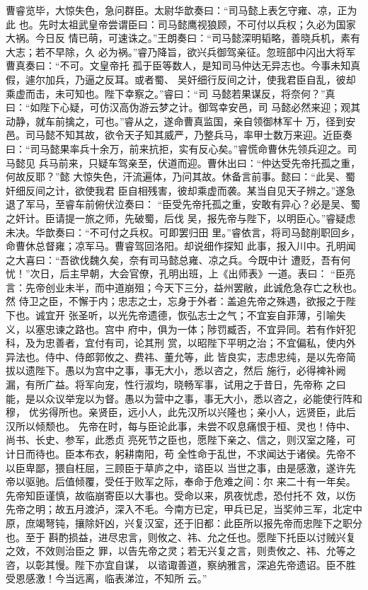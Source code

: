 曹睿览毕，大惊失色，急问群臣。太尉华歆奏曰：“司马懿上表乞守雍、凉，正为此
也。先时太祖武皇帝尝谓臣曰：司马懿鹰视狼顾，不可付以兵权；久必为国家大祸。今日反
情已萌，可速诛之。”王朗奏曰：“司马懿深明韬略，善晓兵机，素有大志；若不早除，久
必为祸。”睿乃降旨，欲兴兵御驾亲征。忽班部中闪出大将军曹真奏曰：“不可。文皇帝托
孤于臣等数人，是知司马仲达无异志也。今事未知真假，遽尔加兵，乃逼之反耳。或者蜀、
吴奸细行反间之计，使我君臣自乱，彼却乘虚而击，未可知也。陛下幸察之。”睿曰：“司
马懿若果谋反，将奈何？”真曰：“如陛下心疑，可仿汉高伪游云梦之计。御驾幸安邑，司
马懿必然来迎；观其动静，就车前擒之，可也。”睿从之，遂命曹真监国，亲自领御林军十
万，径到安邑。司马懿不知其故，欲令天子知其威严，乃整兵马，率甲士数万来迎。近臣奏
曰：“司马懿果率兵十余万，前来抗拒，实有反心矣。”睿慌命曹休先领兵迎之。司马懿见
兵马前来，只疑车驾亲至，伏道而迎。曹休出曰：“仲达受先帝托孤之重，何故反耶？”懿
大惊失色，汗流遍体，乃问其故。休备言前事。懿曰：“此吴、蜀奸细反间之计，欲使我君
臣自相残害，彼却乘虚而袭。某当自见天子辨之。”遂急退了军马，至睿车前俯伏泣奏曰：
“臣受先帝托孤之重，安敢有异心？必是吴、蜀之奸计。臣请提一旅之师，先破蜀，后伐
吴，报先帝与陛下，以明臣心。”睿疑虑未决。华歆奏曰：“不可付之兵权。可即罢归田
里。”睿依言，将司马懿削职回乡，命曹休总督雍；凉军马。曹睿驾回洛阳。却说细作探知
此事，报入川中。孔明闻之大喜曰：“吾欲伐魏久矣，奈有司马懿总雍、凉之兵。今既中计
遭贬，吾有何忧！”次日，后主早朝，大会官僚，孔明出班，上《出师表》一道。表曰：
“臣亮言：先帝创业未半，而中道崩殂；今天下三分，益州罢敝，此诚危急存亡之秋也。然
侍卫之臣，不懈于内；忠志之士，忘身于外者：盖追先帝之殊遇，欲报之于陛下也。诚宜开
张圣听，以光先帝遗德，恢弘志士之气；不宜妄自菲薄，引喻失义，以塞忠谏之路也。宫中
府中，俱为一体；陟罚臧否，不宜异同。若有作奸犯科，及为忠善者，宜付有司，论其刑
赏，以昭陛下平明之治；不宜偏私，使内外异法也。侍中、侍郎郭攸之、费祎、董允等，此
皆良实，志虑忠纯，是以先帝简拔以遗陛下。愚以为宫中之事，事无大小，悉以咨之，然后
施行，必得裨补阙漏，有所广益。将军向宠，性行淑均，晓畅军事，试用之于昔日，先帝称
之曰能，是以众议举宠以为督。愚以为营中之事，事无大小，悉以咨之，必能使行阵和穆，
优劣得所也。亲贤臣，远小人，此先汉所以兴隆也；亲小人，远贤臣，此后汉所以倾颓也。
先帝在时，每与臣论此事，未尝不叹息痛恨于桓、灵也！侍中、尚书、长史、参军，此悉贞
亮死节之臣也，愿陛下亲之、信之，则汉室之隆，可计日而待也。臣本布衣，躬耕南阳，苟
全性命于乱世，不求闻达于诸侯。先帝不以臣卑鄙，猥自枉屈，三顾臣于草庐之中，谘臣以
当世之事，由是感激，遂许先帝以驱驰。后值倾覆，受任于败军之际，奉命于危难之间：尔
来二十有一年矣。先帝知臣谨慎，故临崩寄臣以大事也。受命以来，夙夜忧虑，恐付托不
效，以伤先帝之明；故五月渡泸，深入不毛。今南方已定，甲兵已足，当奖帅三军，北定中
原，庶竭弩钝，攘除奸凶，兴复汉室，还于旧都：此臣所以报先帝而忠陛下之职分也。至于
斟酌损益，进尽忠言，则攸之、祎、允之任也。愿陛下托臣以讨贼兴复之效，不效则治臣之
罪，以告先帝之灵；若无兴复之言，则责攸之、祎、允等之咨，以彰其慢。陛下亦宜自谋，
以谘诹善道，察纳雅言，深追先帝遗诏。臣不胜受恩感激！今当远离，临表涕泣，不知所
云。”

